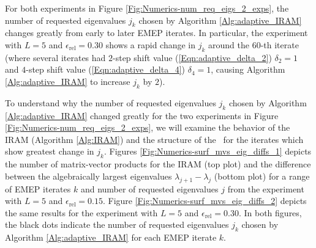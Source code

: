 For both experiments in Figure \ref{Fig:Numerics-num_req_eigs_2_exps}, the number of requested eigenvalues $j_k$ chosen by Algorithm \ref{Alg:adaptive_IRAM} changes greatly from early to later EMEP iterates.  
In particular, the experiment with $L=5$ and $\epsilon_\text{rel} = 0.30$ shows a rapid change in $j_k$ around the $60$-th iterate (where several iterates had $2$-step shift value (\ref{Eqn:adaptive_delta_2}) $\delta_2 = 1$ and $4$-step shift value (\ref{Eqn:adaptive_delta_4}) $\delta_4 = 1$,  causing Algorithm \ref{Alg:adaptive_IRAM} to increase $j_k$ by $2$).







To understand why the number of requested eigenvalues $j_k$ chosen by Algorithm \ref{Alg:adaptive_IRAM} changed greatly for the two experiments in Figure \ref{Fig:Numerics-num_req_eigs_2_exps}, we will examine the behavior of the IRAM (Algorithm \ref{Alg:IRAM}) and the structure of the \emep \ for the iterates which show greatest change in $j_k$.
Figures \ref{Fig:Numerics-surf_mvs_eig_diffs_1} depicts the number of matrix-vector products for the IRAM (top plot) and the difference between the algebraically largest eigenvalues $\lambda_{j+1} - \lambda_j$ (bottom plot) for a range of EMEP iterates $k$ and number of requested eigenvalues $j$ from the experiment with $L=5$ and $\epsilon_\text{rel} = 0.15$.
Figure \ref{Fig:Numerics-surf_mvs_eig_diffs_2} depicts the same results for the experiment with $L=5$ and $\epsilon_\text{rel} = 0.30$.
In both figures, the black dots indicate the number of requested eigenvalues $j_k$ chosen by Algorithm \ref{Alg:adaptive_IRAM} for each EMEP iterate $k$.



